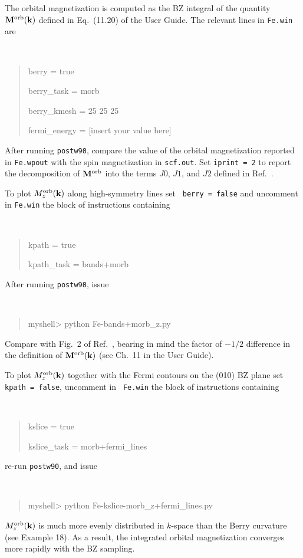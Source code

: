 \documentclass[a4paper,11pt,twoside]{article}
\begin{document}
The orbital magnetization is computed as the BZ integral of the
quantity ${\bf M}^{\rm orb}({\bf k})$ defined in Eq.~(11.20) of the
User Guide. The relevant lines in {\tt Fe.win} are
%
{\tt
\begin{quote}
berry = true

berry\_task = morb

berry\_kmesh = 25 25 25

fermi\_energy = [insert your value here]
\end{quote} }
%
After running {\tt postw90}, compare the value of the orbital
magnetization reported in {\tt Fe.wpout} with the spin magnetization
in {\tt scf.out}. Set {\tt iprint = 2} to report the decomposition of
${\bf M}^{\rm orb}$ into the terms $J0$, $J1$, and $J2$ defined in
Ref.~\cite{lopez-prb12}.

To plot $M_z^{\rm orb}({\bf k})$ along high-symmetry lines set {\tt
  berry = false} and uncomment in {\tt Fe.win} the block of
instructions containing {\tt
\begin{quote}
kpath = true

kpath\_task = bands+morb
\end{quote}
}
After running {\tt postw90}, issue
%
{\tt
\begin{quote}
myshell> python Fe-bands+morb\_z.py
\end{quote} } 
%
Compare with Fig.~2 of Ref.~\cite{lopez-prb12}, bearing in mind the
factor of $-1/2$ difference in the definition of ${\bf M}^{\rm
  orb}({\bf k})$ (see Ch.~11 in the User Guide).

To plot $M_z^{\rm orb}({\bf k})$ together with the Fermi contours on the
(010) BZ plane set {\tt kpath = false}, uncomment in {\tt
  Fe.win} the block of instructions containing 
{\tt
\begin{quote}
kslice = true

kslice\_task = morb+fermi\_lines
\end{quote}
} 
re-run {\tt postw90}, and issue
{\tt
\begin{quote}
myshell> python Fe-kslice-morb\_z+fermi\_lines.py
\end{quote} }
%
$M_z^{\rm orb}({\bf k})$ is much more evenly distributed in $k$-space
than the Berry curvature (see Example 18). As a result, the integrated
orbital magnetization converges more rapidly with the BZ sampling.
\end{document}
